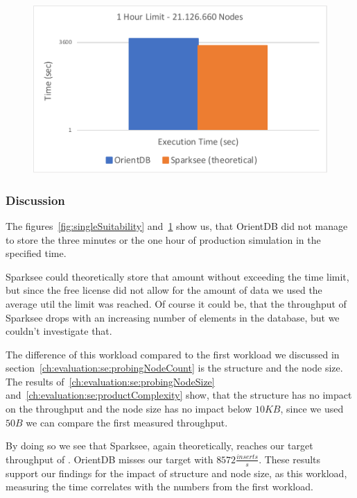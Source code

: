 \begin{figure}[h!]
  \centering
  \includegraphics[width=.75\textwidth]{images/production/hourSuitability}
  \label{fig:hourSuitability}
\end{figure}

\subsubsection{Discussion}
\label{ch:evaluation:se:suitabilityDiscussion}
The figures~\ref{fig:singleSuitability} and~\ref{fig:hourSuitability} show us,
that OrientDB did not manage to store the three minutes or the one hour of production simulation in the specified time.

Sparksee could theoretically store that amount without exceeding the time limit,
but since the free license did not allow for the amount of data we used the average util the limit was reached.
Of course it could be,
that the throughput of Sparksee drops with an increasing number of elements in the database,
but we couldn't investigate that.

The difference of this workload compared to the first workload we discussed in section~\ref{ch:evaluation:se:probingNodeCount} is the structure and the node size.
The results of~\ref{ch:evaluation:se:probingNodeSize} and~\ref{ch:evaluation:se:productComplexity} show,
that the structure has no impact on the throughput and the node size has no impact below $ 10KB $,
since we used $ 50B $ we can compare the first measured throughput.

By doing so we see that Sparksee,
again theoretically,
reaches our target throughput of .
OrientDB misses our target with $ 8572 \frac{inserts}{s} $.
These results support our findings for the impact of structure and node size,
as this workload,
measuring the time correlates with the numbers from the first workload.

